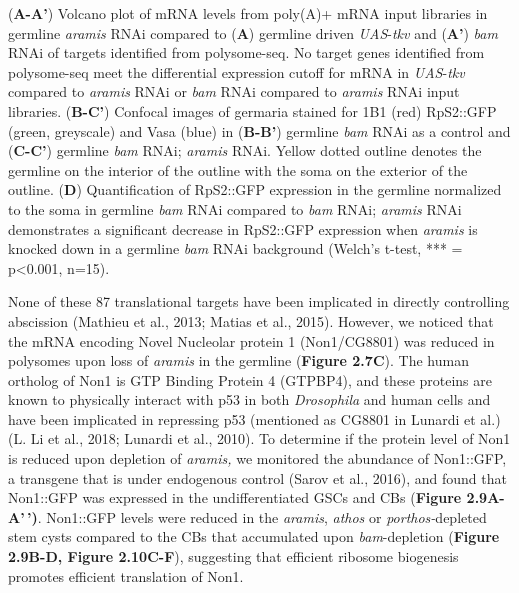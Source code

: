 \documentclass[12pt,oneside]{reedthesis}
\begin{document}
\setlength\parindent{0pt}(\textbf{A-A'}) Volcano plot of mRNA levels from poly(A)+ mRNA input libraries in germline \emph{aramis} RNAi compared to (\textbf{A}) germline driven \emph{UAS}-\emph{tkv} and (\textbf{A'}) \emph{bam} RNAi of targets identified from polysome-seq. No target genes identified from polysome-seq meet the differential expression cutoff for mRNA in \emph{UAS}-\emph{tkv} compared to \emph{aramis} RNAi or \emph{bam} RNAi compared to \emph{aramis} RNAi input libraries. (\textbf{B-C'}) Confocal images of germaria stained for 1B1 (red) RpS2::GFP (green, greyscale) and Vasa (blue) in (\textbf{B-B'}) germline \emph{bam} RNAi as a control and (\textbf{C-C'}) germline \emph{bam} RNAi; \emph{aramis} RNAi. Yellow dotted outline denotes the germline on the interior of the outline with the soma on the exterior of the outline. (\textbf{D}) Quantification of RpS2::GFP expression in the germline normalized to the soma in germline \emph{bam} RNAi compared to \emph{bam} RNAi; \emph{aramis} RNAi demonstrates a significant decrease in RpS2::GFP expression when \emph{aramis} is knocked down in a germline \emph{bam} RNAi background (Welch's t-test, *** = p\textless0.001, n=15).

\textbf{\hfill\break
}

None of these 87 translational targets have been implicated in directly controlling abscission (Mathieu et al., 2013; Matias et al., 2015). However, we noticed that the mRNA encoding Novel Nucleolar protein 1 (Non1/CG8801) was reduced in polysomes upon loss of \emph{aramis} in the germline (\textbf{Figure 2.7C}). The human ortholog of Non1 is GTP Binding Protein 4 (GTPBP4), and these proteins are known to physically interact with p53 in both \emph{Drosophila} and human cells and have been implicated in repressing p53 (mentioned as CG8801 in Lunardi et al.) (L. Li et al., 2018; Lunardi et al., 2010). To determine if the protein level of Non1 is reduced upon depletion of \emph{aramis,} we monitored the abundance of Non1::GFP, a transgene that is under endogenous control (Sarov et al., 2016), and found that Non1::GFP was expressed in the undifferentiated GSCs and CBs (\textbf{Figure 2.9A-A'\,')}. Non1::GFP levels were reduced in the \emph{aramis}, \emph{athos} or \emph{porthos-}depleted stem cysts compared to the CBs that accumulated upon \emph{bam}-depletion (\textbf{Figure 2.9B-D, Figure 2.10C-F}), suggesting that efficient ribosome biogenesis promotes efficient translation of Non1.
\end{document}
